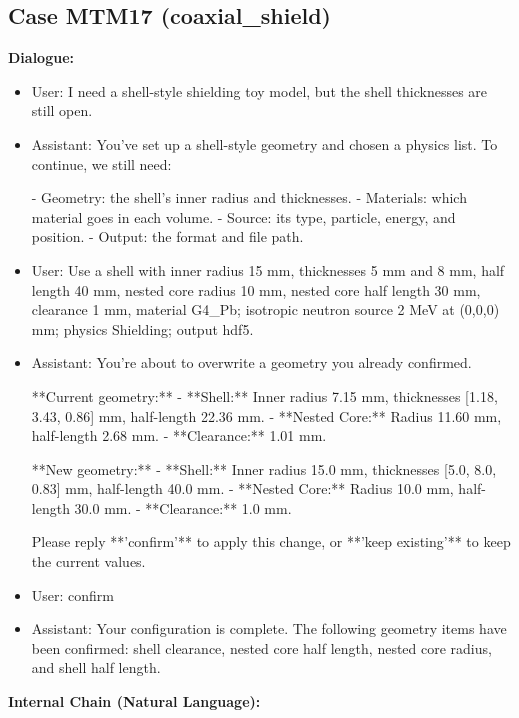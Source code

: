 \documentclass[11pt]{ctexart}
\begin{document}
\subsection{Case MTM17 (coaxial\_shield)}
\textbf{Dialogue:}
\begin{itemize}
\item User: I need a shell-style shielding toy model, but the shell thicknesses are still open.
\item Assistant: You've set up a shell-style geometry and chosen a physics list. To continue, we still need:

- Geometry: the shell's inner radius and thicknesses.
- Materials: which material goes in each volume.
- Source: its type, particle, energy, and position.
- Output: the format and file path.
\item User: Use a shell with inner radius 15 mm, thicknesses 5 mm and 8 mm, half length 40 mm, nested core radius 10 mm, nested core half length 30 mm, clearance 1 mm, material G4\_Pb; isotropic neutron source 2 MeV at (0,0,0) mm; physics Shielding; output hdf5.
\item Assistant: You're about to overwrite a geometry you already confirmed.

**Current geometry:**
- **Shell:** Inner radius 7.15 mm, thicknesses [1.18, 3.43, 0.86] mm, half-length 22.36 mm.
- **Nested Core:** Radius 11.60 mm, half-length 2.68 mm.
- **Clearance:** 1.01 mm.

**New geometry:**
- **Shell:** Inner radius 15.0 mm, thicknesses [5.0, 8.0, 0.83] mm, half-length 40.0 mm.
- **Nested Core:** Radius 10.0 mm, half-length 30.0 mm.
- **Clearance:** 1.0 mm.

Please reply **'confirm'** to apply this change, or **'keep existing'** to keep the current values.
\item User: confirm
\item Assistant: Your configuration is complete. The following geometry items have been confirmed: shell clearance, nested core half length, nested core radius, and shell half length.
\end{itemize}
\textbf{Internal Chain (Natural Language):}
\end{document}
